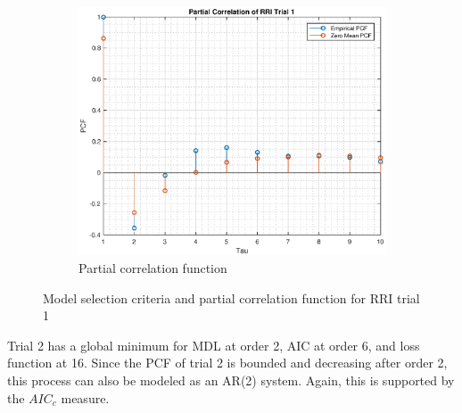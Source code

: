 \begin{figure}[h!]
\begin{subfigure}{0.32\textwidth}
\centering
\includegraphics[width = \textwidth]{heart_pcf_t1}
\caption{Partial correlation function}
\label{fig:heart_pcf_t1}
\end{subfigure}
\caption{Model selection criteria and partial correlation function for RRI trial 1}
\label{heart_t1}
\end{figure}


Trial 2 has a global minimum for MDL at order 2, AIC at order 6, and loss function at 16. Since the PCF of trial 2 is bounded and decreasing after order 2, this process can also be modeled as an AR(2) system. Again, this is supported by the $AIC_c$ measure.\\


